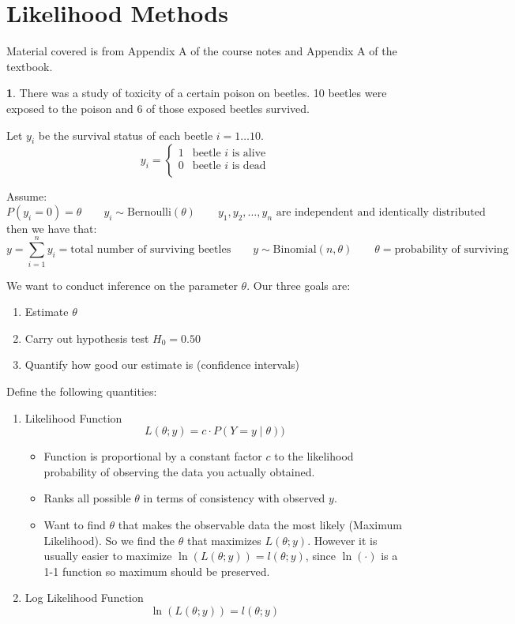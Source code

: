 \documentclass[english,12pt]{article}
\theoremstyle{plain}
\theoremstyle{definition}
\newtheorem*{example}{\protect\examplename}
\theoremstyle{definition} %
\newcommand{\eg}[1]{\begin{example} #1 \end{example} }
\providecommand{\examplename}{Example}
\begin{document}
\section{Likelihood Methods}
Material covered is from Appendix A of the course notes and Appendix A of the textbook.

\eg{
There was a study of toxicity of a certain poison on beetles.  10 beetles were exposed to the poison and 6 of those exposed beetles survived.


Let $y_i$ be the survival status of each beetle $i=1\ldots 10$.
\[y_i=\begin{cases}
1 & \text{beetle }i \text{ is alive}\\
0 & \text{beetle }i \text{ is dead}\\
\end{cases}\]

Assume:
\[P(y_i=0)=\theta\qquad y_i\sim \text{Bernoulli}(\theta)\qquad y_1,y_2,\ldots,y_n\text{ are independent and identically distributed}\] 
then we have that:
\[y=\sum_{i=1}^ny_i=\text{total number of surviving beetles}\qquad y\sim\text{Binomial}(n,\theta)\qquad \theta=\text{probability of surviving}\]

We want to conduct inference on the parameter $\theta$.  Our three goals are:
\begin{enumerate}
\item Estimate $\theta$
\item Carry out hypothesis test $H_0=0.50$
\item Quantify how good our estimate is (confidence intervals)
\end{enumerate}

Define the following quantities:
\begin{enumerate}
\item Likelihood Function
\[L(\theta;y)=c\cdot P(Y=y\mid\theta))\]
\begin{itemize}
\item Function is proportional by a constant factor $c$ to the likelihood probability of observing the data you actually obtained.
\item Ranks all possible $\theta$  in terms of consistency with observed $y$.
\item Want to find $\theta$ that makes the observable data the most likely (Maximum Likelihood).  So we find the $\theta$ that maximizes $L(\theta;y)$.  However it is usually easier to maximize $\ln(L(\theta;y))=l(\theta;y)$, since $\ln(\cdot)$ is a 1-1 function so maximum should be preserved.
\end{itemize}
\item Log Likelihood Function 
\[\ln(L(\theta;y))=l(\theta;y)\]


\end{enumerate}}
\end{document}
